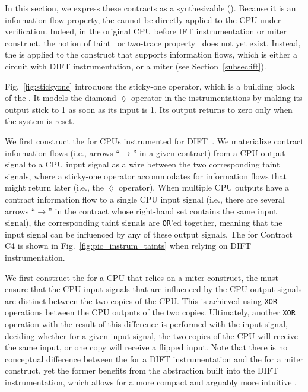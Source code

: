 
In this section, we express these contracts as a synthesizable \pici (\PICI).
Because it is an information flow property, the \PICI cannot be directly applied to the CPU under verification.
Indeed, in the original CPU before IFT instrumentation or miter construct, the notion of taint~\cite{solt2022cellift,ceesay2024mucfi} or two-trace property~\cite{wang2023specification,dinesh2024conjunct,dinesh2025h,tan2025contractshadowlogic} does not yet exist.
Instead, the \PICI is applied to the construct that supports information flows, which is either a circuit with DIFT instrumentation, or a miter (see Section~\ref{subsec:ift}).

Fig.~\ref{fig:stickyone} introduces the sticky-one operator, which is a building block of the \PICI.
It models the diamond $\lozenge$ operator in the instrumentations by making its output stick to 1 as soon as its input is 1.
Its output returns to zero only when the system is reset.

We first construct the \PICI for CPUs instrumented for DIFT~\cite{tiwari2009complete,solt2022cellift}.
We materialize contract information flows (i.e., arrows ``$\rightarrow$'' in a given contract) from a CPU output signal to a CPU input signal as a wire between the two corresponding taint signals, where a sticky-one operator accommodates for information flows that might return later (i.e., the $\lozenge$ operator).
When multiple CPU outputs have a contract information flow to a single CPU input signal (i.e., there are several arrows ``$\rightarrow$'' in the contract whose right-hand set contains the same input signal), the corresponding taint signals are \texttt{OR}'ed together, meaning that the input signal can be influenced by any of these output signals.
The \PICI for Contract C4 is shown in Fig.~\ref{fig:pic_instrum_taints} when relying on DIFT instrumentation.

We first construct the \PICI for a CPU that relies on a miter construct, the \PICI must ensure that the CPU input signals that are influenced by the CPU output signals are distinct between the two copies of the CPU.
This is achieved using \texttt{XOR} operations between the CPU outputs of the two copies.
Ultimately, another \texttt{XOR} operation with the result of this difference is performed with the input signal, deciding whether for a given input signal, the two copies of the CPU will receive the same input, or one copy will receive a flipped input.
Note that there is no conceptual difference between the \PICI for a DIFT instrumentation and the \PICI for a miter construct, yet the former benefits from the abstraction built into the DIFT instrumentation, which allows for a more compact and arguably more intuitive \PICI.

